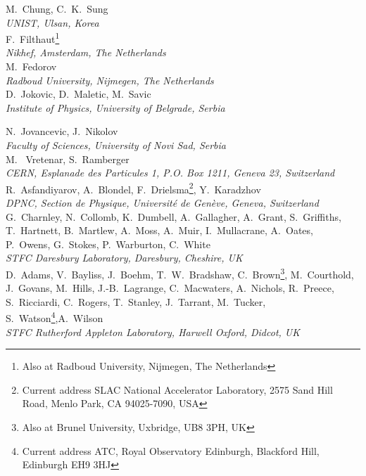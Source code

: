 M.~Chung, C.~K.~Sung
\\{\it 
UNIST, Ulsan, Korea
}\\

F.~Filthaut\footnote{Also at Radboud University, Nijmegen, The Netherlands}
\\{\it
Nikhef, Amsterdam, The Netherlands
}\\

M.~Fedorov
\\{\it
Radboud University, Nijmegen, The Netherlands
}\\

D.~Jokovic, D.~Maletic, M.~Savic
\\{\it
Institute of Physics, University of Belgrade, Serbia
}\\

\newpage

N.~Jovancevic, J.~Nikolov
\\{\it
Faculty of Sciences,  University of Novi Sad,  Serbia
}\\

M. ~Vretenar, S.~Ramberger
\\{\it
CERN, Esplanade des Particules 1, P.O. Box 1211, Geneva 23, Switzerland
}\\

R.~Asfandiyarov, A.~Blondel, F.~Drielsma\footnote{Current address SLAC National Accelerator Laboratory, 2575 Sand Hill Road, Menlo Park, CA 94025-7090, USA}, Y.~Karadzhov 
\\{\it
DPNC, Section de Physique, Universit\'e de Gen\`eve, Geneva, Switzerland
}\\

G.~Charnley, N.~Collomb,  K.~Dumbell, A.~Gallagher, A.~Grant, S.~Griffiths,  T.~Hartnett, B.~Martlew, 
A.~Moss, A.~Muir, I.~Mullacrane, A.~Oates, P.~Owens, G.~Stokes, P.~Warburton, C.~White
\\{\it
STFC Daresbury Laboratory, Daresbury, Cheshire, UK
}\\

D.~Adams,   V.~Bayliss, J.~Boehm, T.~W.~Bradshaw, C.~Brown\footnote{Also at Brunel University, Uxbridge, UB8 3PH, UK}, M.~Courthold,  J.~Govans, M.~Hills, J.-B.~Lagrange, C.~Macwaters, A.~Nichols, R.~Preece, S.~Ricciardi, C.~Rogers, T.~Stanley, J.~Tarrant,  
M.~Tucker, S.~Watson\footnote{Current address ATC, Royal Observatory Edinburgh, Blackford Hill,  Edinburgh EH9 3HJ},A.~Wilson
\\{\it
 STFC Rutherford Appleton Laboratory, Harwell Oxford, Didcot, UK
}\\


